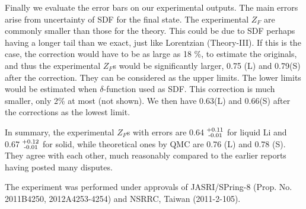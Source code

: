 \documentclass[twocolumn,showpacs,showkeys,fleqn,prl,superscriptaddress]{revtex4}%
\newcommand{\nn}[1]{\textnormal{ #1}}
\begin{document}
Finally we evaluate the error bars on our experimental outputs.
The main errors arise from uncertainty of SDF for the final state.
The experimental $Z_F$ are commonly smaller than those for the theory.
This could be due to SDF perhaps having a longer tail than we exact, just like Lorentzian (Theory-III). 
If this is the case, the correction would have to be as large as 18 \%, to estimate the originals, and thus the experimental $Z_F$s would be significantly larger, 0.75 (L) and 0.79(S) after the correction. 
They can be considered as the upper limits.
The lower limits would be estimated when $\delta$-function used as SDF. This correction is much smaller, only 2\% at most (not shown).
We then have 0.63(L) and 0.66(S) after the corrections as the lowest limit.    

In summary,  the experimental $Z_F$s with errors are 0.64$^{\nn{+0.11}}_{\nn{\;-0.01}}$ for liquid Li and 0.67$^{\nn{+0.12}}_{\nn{\;-0.01}}$ for solid, while theoretical ones by QMC are 0.76 (L) and 0.78 (S).
They agree with each other, much reasonably compared to the earlier reports having posted many disputes.      



The experiment was performed under approvals of JASRI/SPring-8 (Prop. No. 2011B4250, 2012A4253-4254) and NSRRC, Taiwan (2011-2-105).
 
       

%
%



\end{document}
